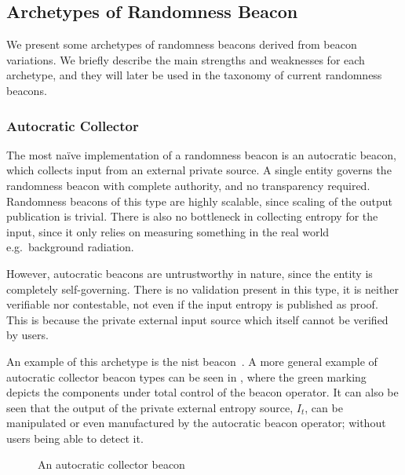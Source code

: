 \subsection{Archetypes of Randomness Beacon}
We present some archetypes of randomness beacons derived from beacon variations. 
We briefly describe the main strengths and weaknesses for each archetype,  and they will later be used in the taxonomy of current randomness beacons.

\subsubsection{Autocratic Collector}\label{ssub:autocratic}
The most naïve implementation of a randomness beacon is an autocratic beacon, which collects input from an external private source.
A single entity governs the randomness beacon with complete authority, and no transparency required.
Randomness beacons of this type are highly scalable, since scaling of the output publication is trivial.
There is also no bottleneck in collecting entropy for the input, since it only relies on measuring something in the real world e.g.\ background radiation.

However, autocratic beacons are untrustworthy in nature, since the entity is completely self-governing.
There is no validation present in this type, it is neither verifiable nor contestable, not even if the input entropy is published as proof.
This is because the private external input source which itself cannot be verified by users.

An example of this archetype is the \gls{nist} beacon~\cite{nistbeacon}.
A more general example of autocratic collector beacon types can be seen in , where the green marking depicts the components under total control of the beacon operator.
It can also be seen that the output of the private external entropy source, $I_t$, can be manipulated or even manufactured by the autocratic beacon operator; without users being able to detect it.

\begin{figure}[htb]
    \centering
    \footnotesize
    \caption{An autocratic collector beacon}\label{fig:autocratic_beacon}
\end{figure}


